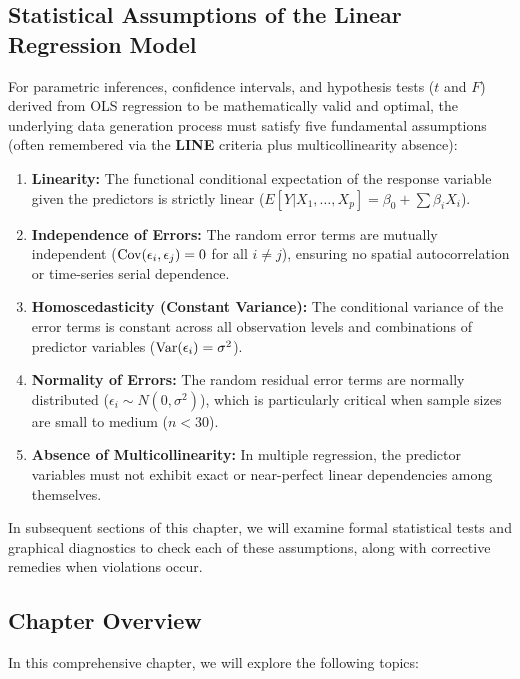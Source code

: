\subsection{Statistical Assumptions of the Linear Regression Model}

For parametric inferences, confidence intervals, and hypothesis tests ($t$ and $F$) derived from OLS regression to be mathematically valid and optimal, the underlying data generation process must satisfy five fundamental assumptions (often remembered via the \textbf{LINE} criteria plus multicollinearity absence):

\begin{enumerate}
	\item \textbf{Linearity:} The functional conditional expectation of the response variable given the predictors is strictly linear ($E[Y|X_1,\dots,X_p] = \beta_0 + \sum \beta_i X_i$).
	\item \textbf{Independence of Errors:} The random error terms are mutually independent ($\operatorname{Cov}(\epsilon_i, \epsilon_j) = 0$ for all $i \neq j$), ensuring no spatial autocorrelation or time-series serial dependence.
	\item \textbf{Homoscedasticity (Constant Variance):} The conditional variance of the error terms is constant across all observation levels and combinations of predictor variables ($\operatorname{Var}(\epsilon_i) = \sigma^2$).
	\item \textbf{Normality of Errors:} The random residual error terms are normally distributed ($\epsilon_i \sim N(0, \sigma^2)$), which is particularly critical when sample sizes are small to medium ($n < 30$).
	\item \textbf{Absence of Multicollinearity:} In multiple regression, the predictor variables must not exhibit exact or near-perfect linear dependencies among themselves.
\end{enumerate}

In subsequent sections of this chapter, we will examine formal statistical tests and graphical diagnostics to check each of these assumptions, along with corrective remedies when violations occur.

\subsection{Chapter Overview}

In this comprehensive chapter, we will explore the following topics:

